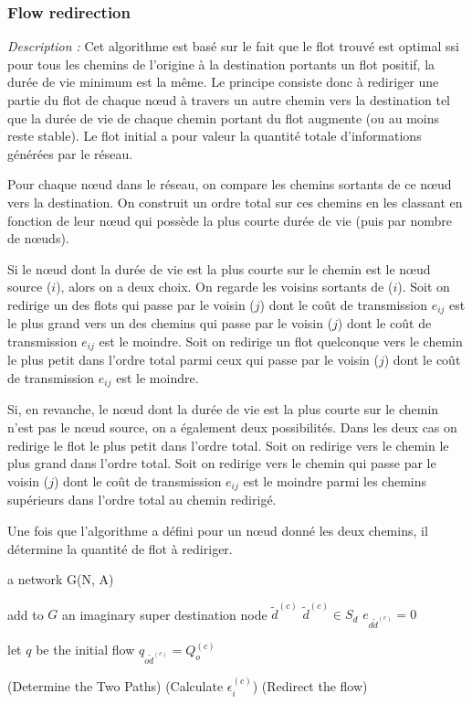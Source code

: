 \subsubsection{Flow redirection \cite{Chang2000}}


\emph{Description :}
Cet algorithme est basé sur le fait que le flot trouvé est optimal ssi pour tous les chemins de l'origine à la destination portants un flot positif, la durée de vie minimum est la même. Le principe consiste donc à rediriger une partie du flot de chaque nœud à travers un autre chemin vers la destination tel que la durée de vie de chaque chemin portant du flot augmente (ou au moins reste stable). Le flot initial a pour valeur la quantité totale d'informations générées par le réseau.

Pour chaque nœud dans le réseau, on compare les chemins sortants de ce nœud vers la destination. On construit un ordre total sur ces chemins en les classant en fonction de leur nœud qui possède la plus courte durée de vie (puis par nombre de nœuds).

Si le nœud dont la durée de vie est la plus courte sur le chemin est le nœud source ($i$), alors on a deux choix. On regarde les voisins sortants de ($i$). Soit on redirige un des flots qui passe par le voisin ($j$) dont le coût de transmission $e_{ij}$ est le plus grand vers un des chemins qui passe par le voisin ($j$) dont le coût de transmission $e_{ij}$ est le moindre. Soit on redirige un flot quelconque vers le chemin le plus petit dans l'ordre total parmi ceux qui passe par le voisin ($j$) dont le coût de transmission $e_{ij}$ est le moindre.

Si, en revanche, le nœud dont la durée de vie est la plus courte sur le chemin n'est pas le nœud source, on a également deux possibilités. Dans les deux cas on redirige le flot le plus petit dans l'ordre total. Soit on redirige vers le chemin le plus grand dans l'ordre total. Soit on redirige vers le chemin qui passe par le voisin ($j$) dont le coût de transmission $e_{ij}$ est le moindre parmi les chemins supérieurs dans l'ordre total au chemin redirigé.

Une fois que l'algorithme a défini pour un nœud donné les deux chemins, il détermine la quantité de flot à rediriger.

\begin{algorithm}[H]
\caption{$FR()$}
\label{algo_FR}
\begin{algorithmic}
\REQUIRE a network G(N, A)

add to $G$ an imaginary super destination node $\tilde{d}^{(c)}$
	\STATE $\tilde{d}^{(c)} \in S_d$
	\STATE $e_{d \tilde{d}^{(c)}} = 0$
\ENDFOR

let $q$ be the initial flow
	\STATE $q_{o \tilde{d}^{(c)}} = Q_o^{(c)}$
\ENDFOR

		\STATE (Determine the Two Paths)
		\STATE (Calculate $\epsilon_i^{(c)}$)
		\STATE (Redirect the flow)
	\ENDFOR
\ENDFOR

\RETURN 
\end{algorithmic}
\end{algorithm}



